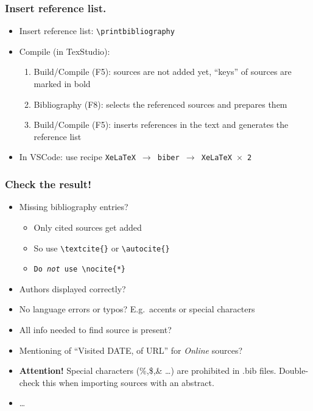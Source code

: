 \documentclass[aspectratio=169]{beamer}
\begin{document}
\begin{frame}[fragile]
  \frametitle{Insert reference list.}

  \begin{itemize}
    \item Insert reference list: \verb|\printbibliography|

    \item Compile (in TexStudio):

          \begin{enumerate}
            \item Build/Compile (F5): sources are not added yet, ``keys'' of sources are marked in bold
            \item Bibliography (F8): selects the referenced sources and prepares them
            \item Build/Compile (F5): inserts references in the text and generates the reference list
          \end{enumerate}
	\item  In VSCode: use recipe \texttt{XeLaTeX $\rightarrow$ biber $\rightarrow$ XeLaTeX $\times$ 2}
  \end{itemize}
\end{frame}

\begin{frame}
  \frametitle{Check the result!}
  \begin{itemize}
  	\item Missing bibliography entries?
  	\begin{itemize}
  		\item Only cited sources get added
  		\item So use \texttt{{\textbackslash}textcite\{\}} or \texttt{{\textbackslash}autocite\{\}}
  		\item \texttt{Do \emph{not} use \texttt{{\textbackslash}nocite\{*\}}}
  	\end{itemize}
    \item Authors displayed correctly?
    \item No language errors or typos? E.g.\ accents or special characters
    \item All info needed to find source is present?
    \item Mentioning of ``Visited DATE, of URL'' for \textit{Online} sources?
    \item \textbf{Attention!} Special characters (\%,\$,\& \ldots) are prohibited in .bib files. Double-check this when importing sources with an abstract.
    \item \ldots
  \end{itemize}
\end{frame}
\end{document}
